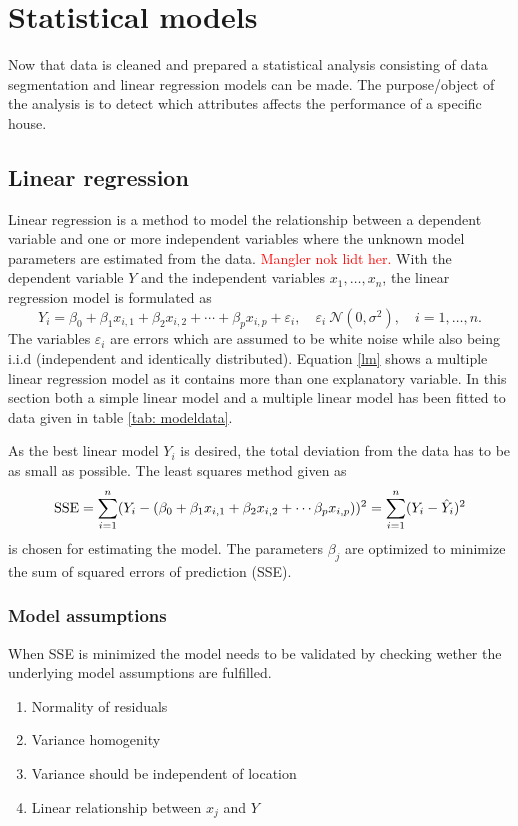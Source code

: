 \chapter{Statistical models}
Now that data is cleaned and prepared a statistical analysis consisting of data segmentation and linear regression models can be made. The purpose/object of the analysis is to detect which attributes affects the performance of a specific house. 


\section{Linear regression}
Linear regression is a method to model the relationship between a dependent variable and one or more independent variables where the unknown model parameters are estimated from the data. \textcolor{red}{Mangler nok lidt her.} With the dependent variable $Y$ and the independent variables $x_1, \dots, x_n$, the linear regression model is formulated as 
\begin{equation}
    Y_i = \beta_0 + \beta_1 x_{i,1} + \beta_2 x_{i,2} + \cdots + \beta_p x_{i,p} + \varepsilon_i, \quad \varepsilon_i ~ \mathcal{N}(0,\sigma^2), \quad i = 1,\dots, n. \label{lm}
\end{equation}
The variables $\varepsilon_i$ are errors which are assumed to be white noise while also being i.i.d (independent and identically distributed). Equation \eqref{lm} shows a multiple linear regression model as it contains more than one explanatory variable. In this section both a simple linear model and a multiple linear model has been fitted to data given in table \ref{tab: modeldata}. 

\noindent As the best linear model $Y_i$ is desired, the total deviation from the data has to be as small as possible. The least squares method given as 
\begin{equation}
    \text{SSE} = \sum_{i=1}^n (Y_i - (\beta_0 + \beta_1 x_{i,1} + \beta_2 x_{i,2} + \cdots  \beta_p x_{i,p}))^2 = \sum_{i=1}^n (Y_i - \Hat{Y}_i)^2 
\end{equation} 
is chosen for estimating the model. The parameters $\beta_j$ are optimized to minimize the sum of squared errors of prediction (SSE).

\subsection{Model assumptions}
When SSE is minimized the model needs to be validated by checking wether the underlying model assumptions are fulfilled. 
\begin{enumerate} [label=\textbf{\arabic*}]
    \item Normality of residuals 
    \item Variance homogenity
    \item Variance should be independent of location
    \item Linear relationship between $x_j$ and $Y$
\end{enumerate}

